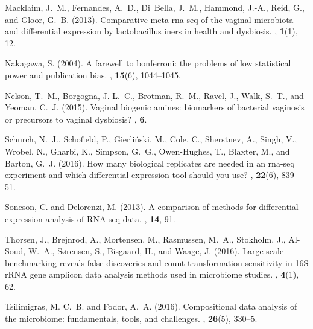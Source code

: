 \documentclass[11pt]{article}
\begin{document}
\begin{thebibliography}{}
Macklaim, J.~M., Fernandes, A.~D., Di~Bella, J.~M., Hammond, J.-A., Reid, G.,
  and Gloor, G.~B. (2013).
\newblock Comparative meta-rna-seq of the vaginal microbiota and differential
  expression by lactobacillus iners in health and dysbiosis.
, {\bf 1}(1), 12.

Nakagawa, S. (2004).
\newblock A farewell to bonferroni: the problems of low statistical power and
  publication bias.
, {\bf 15}(6), 1044--1045.

Nelson, T.~M., Borgogna, J.-L.~C., Brotman, R.~M., Ravel, J., Walk, S.~T., and
  Yeoman, C.~J. (2015).
\newblock Vaginal biogenic amines: biomarkers of bacterial vaginosis or
  precursors to vaginal dysbiosis?
, {\bf 6}.

Schurch, N.~J., Schofield, P., Gierli{\'n}ski, M., Cole, C., Sherstnev, A.,
  Singh, V., Wrobel, N., Gharbi, K., Simpson, G.~G., Owen-Hughes, T., Blaxter,
  M., and Barton, G.~J. (2016).
\newblock How many biological replicates are needed in an rna-seq experiment
  and which differential expression tool should you use?
, {\bf 22}(6), 839--51.

Soneson, C. and Delorenzi, M. (2013).
\newblock A comparison of methods for differential expression analysis of
  {RNA-seq} data.
, {\bf 14}, 91.

Thorsen, J., Brejnrod, A., Mortensen, M., Rasmussen, M.~A., Stokholm, J.,
  Al-Soud, W.~A., S{\o}rensen, S., Bisgaard, H., and Waage, J. (2016).
\newblock Large-scale benchmarking reveals false discoveries and count
  transformation sensitivity in 16{S} r{RNA} gene amplicon data analysis
  methods used in microbiome studies.
, {\bf 4}(1), 62.

Tsilimigras, M. C.~B. and Fodor, A.~A. (2016).
\newblock Compositional data analysis of the microbiome: fundamentals, tools,
  and challenges.
, {\bf 26}(5), 330--5.


\end{thebibliography}
\end{document}
